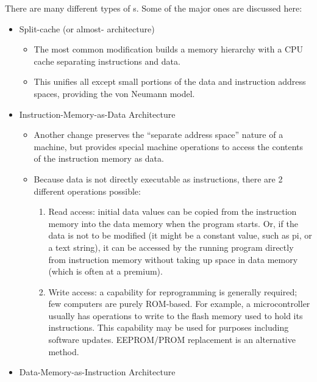\begin{definition}
  \begin{remark}\label{rmk:Types_Modified_Harvard_Architecture}
    There are many different types of s.
    Some of the major ones are discussed here:
    \begin{itemize}[noitemsep]
    \item Split-cache (or almost- architecture)
      \begin{itemize}[noitemsep]
      \item The most common modification builds a memory hierarchy with a CPU cache separating instructions and data.
      \item This unifies all except small portions of the data and instruction address spaces, providing the von Neumann model.
      \end{itemize}
    \item Instruction-Memory-as-Data Architecture
      \begin{itemize}[noitemsep]
      \item Another change preserves the ``separate address space'' nature of a  machine, but provides special machine operations to access the contents of the instruction memory as data.
      \item Because data is not directly executable as instructions, there are 2 different operations possible:
        \begin{enumerate}[noitemsep]
        \item Read access: initial data values can be copied from the instruction memory into the data memory when the program starts.
          Or, if the data is not to be modified (it might be a constant value, such as pi, or a text string), it can be accessed by the running program directly from instruction memory without taking up space in data memory (which is often at a premium).
        \item Write access: a capability for reprogramming is generally required; few computers are purely ROM-based.
          For example, a microcontroller usually has operations to write to the flash memory used to hold its instructions.
          This capability may be used for purposes including software updates. EEPROM/PROM replacement is an alternative method.
        \end{enumerate}
      \end{itemize}
    \item Data-Memory-as-Instruction Architecture

\end{itemize}
\end{remark}
\end{definition}
